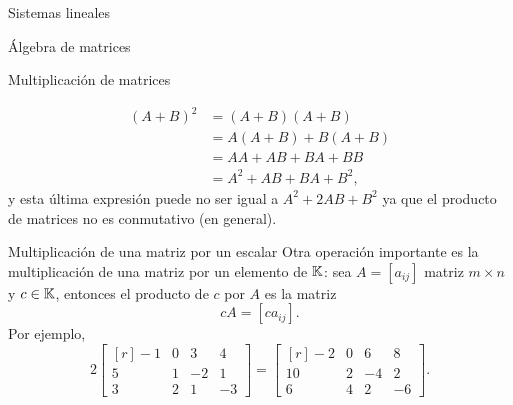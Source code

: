 \begin{chapter}{Sistemas lineales}
\begin{section}{\'Algebra de matrices}
\begin{subsection}{Multiplicaci\'on de matrices}
\begin{itemize}
                    \begin{align*}
                    (A+B)^2 &= (A+B)(A+B) \\&= A(A+B) + B(A+B) \\&= AA + AB + BA + BB \\&= A^2 + AB + BA + B^2,
                    \end{align*}
                    y  esta última expresión puede no ser  igual a $A^2 + 2AB + B^2$ ya que el producto de matrices no es conmutativo (en general). 
                \end{itemize}
        \end{subsection}
        
        
        \begin{subsection}{Multiplicaci\'on de una matriz por un escalar} Otra operación importante es la multiplicación de una matriz por un elemento de $\mathbb K$: sea $A=[a_{ij}]$ matriz $m \times n$ y $c \in \mathbb K$,  entonces el producto de $c$ por $A$ es la matriz
            $$
            cA=[ca_{ij}].
            $$ 
        Por ejemplo, 
        $$
        2\begin{bmatrix*}[r]
        -1& 0& 3 & 4\\
        5& 1& -2 & 1\\
        3& 2& 1 & -3
        \end{bmatrix*} =
        \begin{bmatrix*}[r]
        -2& 0& 6& 8\\
        10& 2& -4 & 2\\
        6& 4& 2 & -6
        \end{bmatrix*}.
        $$
        

\end{subsection}
\end{section}
\end{chapter}
